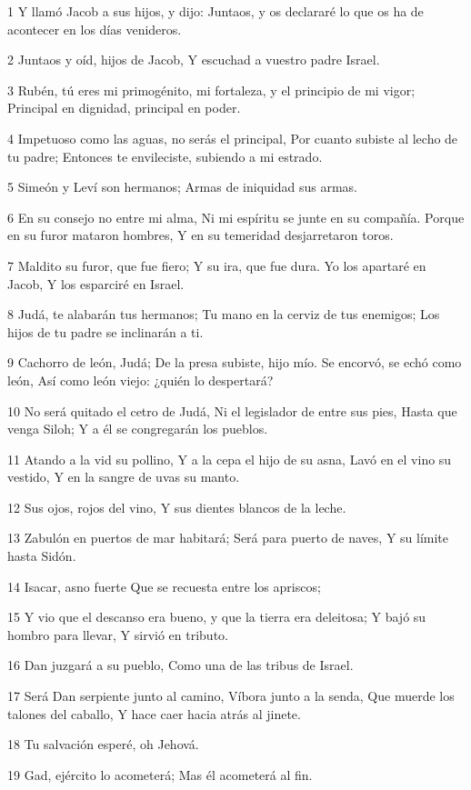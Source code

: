 1 Y llamó Jacob a sus hijos, y dijo: Juntaos, y os declararé lo que os ha de acontecer en los días venideros.

2 Juntaos y oíd, hijos de Jacob,
Y escuchad a vuestro padre Israel.

3 Rubén, tú eres mi primogénito, mi fortaleza, y el principio de mi vigor;
Principal en dignidad, principal en poder.

4 Impetuoso como las aguas, no serás el principal,
Por cuanto subiste al lecho de tu padre;
Entonces te envileciste, subiendo a mi estrado.

5 Simeón y Leví son hermanos;
Armas de iniquidad sus armas.

6 En su consejo no entre mi alma,
Ni mi espíritu se junte en su compañía.
Porque en su furor mataron hombres,
Y en su temeridad desjarretaron toros.

7 Maldito su furor, que fue fiero;
Y su ira, que fue dura.
Yo los apartaré en Jacob,
Y los esparciré en Israel.

8 Judá, te alabarán tus hermanos;
Tu mano en la cerviz de tus enemigos;
Los hijos de tu padre se inclinarán a ti.

9 Cachorro de león, Judá;
De la presa subiste, hijo mío.
Se encorvó, se echó como león,
Así como león viejo: ¿quién lo despertará?

10 No será quitado el cetro de Judá,
Ni el legislador de entre sus pies,
Hasta que venga Siloh;
Y a él se congregarán los pueblos.

11 Atando a la vid su pollino,
Y a la cepa el hijo de su asna,
Lavó en el vino su vestido,
Y en la sangre de uvas su manto.

12 Sus ojos, rojos del vino,
Y sus dientes blancos de la leche.

13 Zabulón en puertos de mar habitará;
Será para puerto de naves,
Y su límite hasta Sidón.

14 Isacar, asno fuerte
Que se recuesta entre los apriscos;

15 Y vio que el descanso era bueno, y que la tierra era deleitosa;
Y bajó su hombro para llevar,
Y sirvió en tributo.

16 Dan juzgará a su pueblo,
Como una de las tribus de Israel.

17 Será Dan serpiente junto al camino,
Víbora junto a la senda,
Que muerde los talones del caballo,
Y hace caer hacia atrás al jinete.

18 Tu salvación esperé, oh Jehová.

19 Gad, ejército lo acometerá;
Mas él acometerá al fin.

